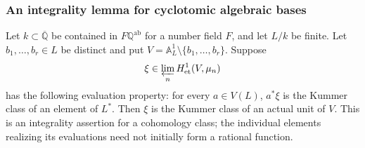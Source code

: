 \subsubsection*{An integrality lemma for cyclotomic algebraic bases}

Let $k\subset\overline{\mathbb Q}$ be contained in
$F\mathbb Q^{\mathrm{ab}}$ for a number field $F$, and let $L/k$ be
finite. Let $b_1,\ldots,b_r\in L$ be distinct and put
$V=\mathbb A^1_L\setminus\{b_1,\ldots,b_r\}$.
Suppose
\[
 \xi\in\varprojlim_n H^1_{\mathrm{et}}(V,\mu_n)
\]
has the following evaluation property: for every $a\in V(L)$,
$a^*\xi$ is the Kummer class of an element of $L^*$.
Then $\xi$ is the Kummer class of an actual unit of $V$.
This is an integrality assertion for a cohomology class; the individual
elements realizing its evaluations need not initially form a rational
function.

